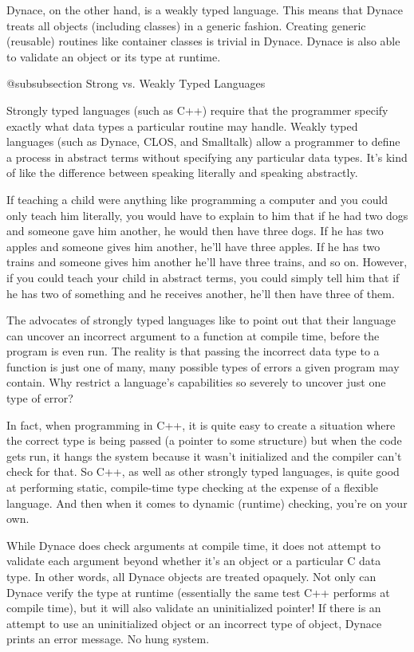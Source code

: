 Dynace, on the other hand, is a weakly typed language.  This means
that Dynace treats all objects (including classes) in a generic
fashion.  Creating generic (reusable) routines like container classes
is trivial in Dynace.  Dynace is also able to validate an object or
its type at runtime.


@subsubsection Strong vs. Weakly Typed Languages

Strongly typed languages (such as C++) require that the programmer
specify exactly what data types a particular routine may handle.
Weakly typed languages (such as Dynace, CLOS, and Smalltalk)
allow a programmer to define a process in abstract terms without
specifying any particular data types.  It's kind of like the
difference between speaking literally and speaking abstractly.

If teaching a child were anything like programming a computer and you
could only teach him literally, you would have to explain to him that
if he had two dogs and someone gave him another, he would then have
three dogs.  If he has two apples and someone gives him another, he'll
have three apples.  If he has two trains and someone gives him another
he'll have three trains, and so on.  However, if you could teach your
child in abstract terms, you could simply tell him that if he has two
of something and he receives another, he'll then have three of them.

The advocates of strongly typed languages like to point out that their
language can uncover an incorrect argument to a function at compile
time, before the program is even run.  The reality is that passing
the incorrect data type to a function is just one of many, many possible
types of errors a given program may contain.  Why restrict a language's
capabilities so severely to uncover just one type of error?

In fact, when programming in C++, it is quite easy to create a situation
where the correct type is being passed (a pointer to some structure)
but when the code gets run, it hangs the system because it wasn't
initialized and the compiler can't check for that. So C++, as well as
other strongly typed languages, is quite good at performing static,
compile-time type checking at the expense of a flexible language.
And then when it comes to dynamic (runtime) checking, you're on your
own.

While Dynace does check arguments at compile time, it does not attempt
to validate each argument beyond whether it's an object or a particular
C data type.  In other words, all Dynace objects are treated opaquely.
Not only can Dynace verify the type at runtime (essentially the same
test C++ performs at compile time), but it will also validate an
uninitialized pointer!  If there is an attempt to use an uninitialized
object or an incorrect type of object, Dynace prints an error message.
No hung system.

